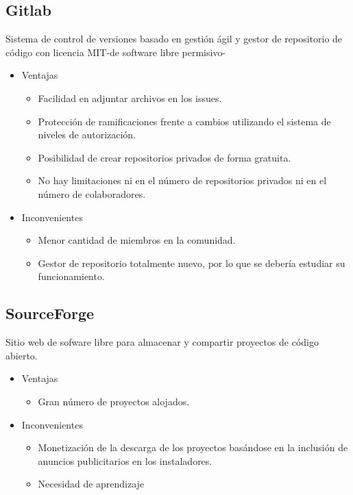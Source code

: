 \subsection{Gitlab}
Sistema de control de versiones basado en gestión ágil \nocite{wiki:gitLab} y gestor de repositorio de código con licencia MIT-de software libre permisivo-\nocite{wiki:MIT}
\begin{itemize}
\item Ventajas
\begin{itemize}
\item Facilidad en adjuntar archivos en los issues.
\item Protección de ramificaciones frente a cambios utilizando el sistema de niveles de autorización. \cite{openbinars:gitlab}
\item Posibilidad de crear repositorios privados de forma gratuita. 
\item No hay limitaciones ni en el número de repositorios privados ni en el número de colaboradores. 
\end{itemize}
\end{itemize}
\begin{itemize}
\item Inconvenientes
\begin{itemize}
\item Menor cantidad de miembros en la comunidad. 
\item Gestor de repositorio totalmente nuevo, por lo que se debería estudiar su funcionamiento. \nocite{platzi:gitlab}
\end{itemize}
\end{itemize}

\subsection{SourceForge}
Sitio web  de sofware libre para almacenar y compartir proyectos de código abierto.
\begin{itemize}
\item Ventajas
\begin{itemize}
\item Gran número de proyectos alojados.
\end{itemize}
\end{itemize}
\begin{itemize}
\item Inconvenientes
\begin{itemize}
\item Monetización de la descarga de los proyectos basándose en la inclusión de anuncios publicitarios en los instaladores.\cite{wiki:SouceForge}
\item Necesidad de aprendizaje 
\end{itemize}
\end{itemize}

